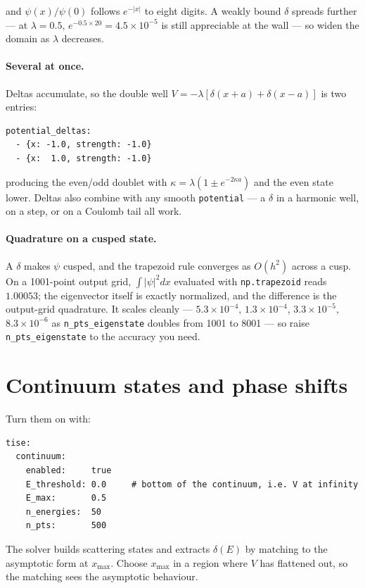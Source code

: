 \documentclass[11pt]{article}
\begin{document}
and $\psi(x)/\psi(0)$ follows $e^{-|x|}$ to eight digits. A weakly bound
$\delta$ spreads further --- at $\lambda = 0.5$,
$e^{-0.5\times 20} = 4.5\times10^{-5}$ is still appreciable at the wall --- so
widen the domain as $\lambda$ decreases.

\paragraph{Several at once.} Deltas accumulate, so the double well
$V = -\lambda[\delta(x+a) + \delta(x-a)]$ is two entries:
\begin{lstlisting}[style=yaml]
potential_deltas:
  - {x: -1.0, strength: -1.0}
  - {x:  1.0, strength: -1.0}
\end{lstlisting}
producing the even/odd doublet with $\kappa = \lambda(1 \pm e^{-2\kappa a})$ and
the even state lower. Deltas also combine with any smooth \texttt{potential} ---
a $\delta$ in a harmonic well, on a step, or on a Coulomb tail all work.

\paragraph{Quadrature on a cusped state.} A $\delta$ makes $\psi$ cusped, and
the trapezoid rule converges as $O(h^{2})$ across a cusp. On a 1001-point
output grid, $\int|\psi|^{2}dx$ evaluated with \texttt{np.trapezoid} reads
$1.00053$; the eigenvector itself is exactly normalized, and the difference is
the output-grid quadrature. It scales cleanly ---
$5.3\times10^{-4}$, $1.3\times10^{-4}$, $3.3\times10^{-5}$, $8.3\times10^{-6}$
as \texttt{n\_pts\_eigenstate} doubles from 1001 to 8001 --- so raise
\texttt{n\_pts\_eigenstate} to the accuracy you need.

\section{Continuum states and phase shifts}
\label{sec:continuum}

Turn them on with:
\begin{lstlisting}[style=yaml]
tise:
  continuum:
    enabled:     true
    E_threshold: 0.0     # bottom of the continuum, i.e. V at infinity
    E_max:       0.5
    n_energies:  50
    n_pts:       500
\end{lstlisting}

The solver builds scattering states and extracts $\delta(E)$ by matching to the
asymptotic form at $x_{\max}$. Choose $x_{\max}$ in a region where $V$ has
flattened out, so the matching sees the asymptotic behaviour.
\end{document}
